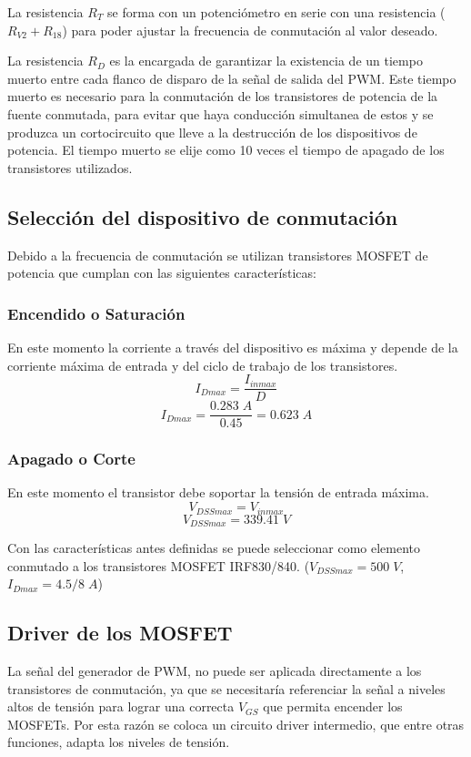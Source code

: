 \documentclass[11pt, a4paper]{article}
\begin{document}
La resistencia $R_T$ se forma con un potenciómetro en serie con una resistencia ($R_{V2} + R_{18}$) para poder ajustar la frecuencia de conmutación al valor deseado.

La resistencia $R_D$ es la encargada de garantizar la existencia de un tiempo muerto entre cada flanco de disparo de la señal de salida del PWM. Este tiempo muerto es necesario para la conmutación de los transistores de potencia de la fuente conmutada, para evitar que haya conducción simultanea de estos y se produzca un cortocircuito que lleve a la destrucción de los dispositivos de potencia. El tiempo muerto se elije como 10 veces el tiempo de apagado de los transistores utilizados.

\subsection{Selección del dispositivo de conmutación}
Debido a la frecuencia de conmutación se utilizan transistores MOSFET de potencia que cumplan con las siguientes características:
\subsubsection{Encendido o Saturación}
En este momento la corriente a través del dispositivo es máxima y depende de la corriente máxima de entrada y del ciclo de trabajo de los transistores.
\begin{equation}
I_{Dmax} = \frac{I_{inmax}}{D}
\label{IDmax}
\end{equation}
\[ I_{Dmax} = \frac{0.283 \; A}{0.45} = 0.623 \; A \]

\subsubsection{Apagado o Corte}
En este momento el transistor debe soportar la tensión de entrada máxima.
\begin{equation}
V_{DSSmax} = V_{inmax}
\label{VDmax}
\end{equation}
\[ V_{DSSmax} = 339.41 \; V \]

Con las características antes definidas se puede seleccionar como elemento conmutado a los transistores MOSFET IRF830/840. ($V_{DSSmax} = 500 \; V$, $I_{Dmax} = 4.5/8 \; A$)

\subsection{Driver de los MOSFET}
La señal del generador de PWM, no puede ser aplicada directamente a los transistores de conmutación, ya que se necesitaría referenciar la señal a niveles altos de tensión para lograr una correcta $V_{GS}$ que permita
encender los MOSFETs. Por esta razón se coloca un circuito driver intermedio, que entre otras funciones, adapta los niveles de tensión.
\end{document}
